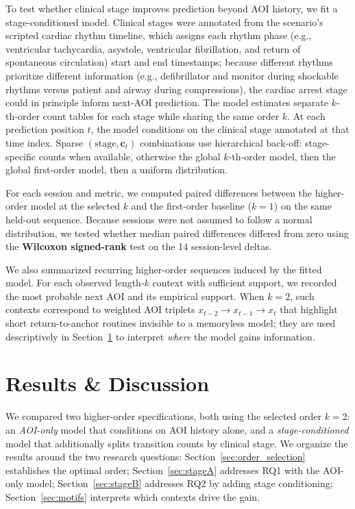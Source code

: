 \documentclass[runningheads]{llncs}
\begin{document}
To test whether clinical stage improves prediction beyond AOI history, we fit a stage-conditioned model. Clinical stages were annotated from the scenario's scripted cardiac rhythm timeline, which assigns each rhythm phase (e.g., ventricular tachycardia, asystole, ventricular fibrillation, and return of spontaneous circulation) start and end timestamps; because different rhythms prioritize different information (e.g., defibrillator and monitor during shockable rhythms versus patient and airway during compressions), the cardiac arrest stage could in principle inform next-AOI prediction. The model estimates separate $k$-th-order count tables for each stage while sharing the same order $k$. At each prediction position $t$, the model conditions on the clinical stage annotated at that time index. Sparse $(\text{stage}, \mathbf{c}_t)$ combinations use hierarchical back-off: stage-specific counts when available, otherwise the global $k$-th-order model, then the global first-order model, then a uniform distribution.

For each session and metric, we computed paired differences between the higher-order model at the selected $k$ and the first-order baseline ($k{=}1$) on the same held-out sequence. Because sessions were not assumed to follow a normal distribution, we tested whether median paired differences differed from zero using the \textbf{Wilcoxon signed-rank} test on the 14 session-level deltas.

We also summarized recurring higher-order sequences induced by the fitted model. For each observed length-$k$ context with sufficient support, we recorded the most probable next AOI and its empirical support. When $k{=}2$, such contexts correspond to weighted AOI triplets $x_{t-2}{\rightarrow}x_{t-1}{\rightarrow}x_t$ that highlight short return-to-anchor routines invisible to a memoryless model; they are used descriptively in Section~\ref{sec:results} to interpret \emph{where} the model gains information.

\section{Results \& Discussion}
\label{sec:results}

We compared two higher-order specifications, both using the selected order $k{=}2$: an \emph{AOI-only} model that conditions on AOI history alone, and a \emph{stage-conditioned} model that additionally splits transition counts by clinical stage. We organize the results around the two research questions: Section~\ref{sec:order_selection} establishes the optimal order; Section~\ref{sec:stageA} addresses RQ1 with the AOI-only model; Section~\ref{sec:stageB} addresses RQ2 by adding stage conditioning; Section~\ref{sec:motifs} interprets which contexts drive the gain.
\end{document}
